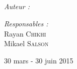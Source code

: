 \begin{titlepage}
\begin{center}
\textsc{\Large \reportsubject}\\[0.5cm]
\HRule \\[0.4cm]
{\LARGE \bfseries \reporttitle}\\[0.4cm]
\HRule \\[1.5cm]

\begin{minipage}[t]{0.3\textwidth}
  \begin{flushleft} \large
    \emph{Auteur :}\\
    \reportauthor
  \end{flushleft}
\end{minipage}
\begin{minipage}[t]{0.6\textwidth}
  \begin{flushright} \large
    \emph{Responsables :} \\
    Rayan \textsc{Chikhi} \\
    Mikael \textsc{Salson}
  \end{flushright}
\end{minipage}

\vfill

{\large 30 mars - 30 juin 2015}

\end{center}

\end{titlepage}
